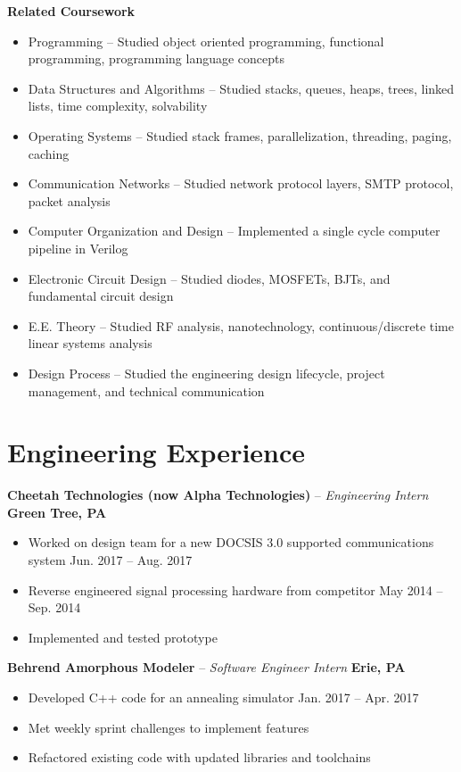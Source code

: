 \documentclass[letterpaper,10pt]{article}
\begin{document}
\textbf{Related Coursework}
{\setlength{\parskip}{0pt}\begin{itemize}
\item Programming -- Studied object oriented programming, functional programming, programming language concepts
\item Data Structures and Algorithms -- Studied stacks, queues, heaps, trees, linked lists, time complexity, solvability
\item Operating Systems -- Studied stack frames, parallelization, threading, paging, caching
\item Communication Networks -- Studied network protocol layers, SMTP protocol, packet analysis
\item Computer Organization and Design -- Implemented a single cycle computer pipeline in Verilog
\item Electronic Circuit Design -- Studied diodes, MOSFETs, BJTs, and fundamental circuit design
\item E.E. Theory -- Studied RF analysis, nanotechnology, continuous/discrete time linear systems analysis
\item Design Process -- Studied the engineering design lifecycle, project management, and technical communication
\end{itemize}}

\section{Engineering Experience}
\textbf{Cheetah Technologies (now Alpha Technologies)} -- \textit{Engineering Intern} \hfill \textbf{Green Tree, PA}
{\setlength{\parskip}{0pt}\begin{itemize}
\item Worked on design team for a new DOCSIS 3.0 supported communications system \hfill Jun. 2017 -- Aug. 2017
\item Reverse engineered signal processing hardware from competitor \hfill May 2014 -- Sep. 2014
\item Implemented and tested prototype
\end{itemize}}
\textbf{Behrend Amorphous Modeler} -- \textit{Software Engineer Intern} \hfill \textbf{Erie, PA}
{\setlength{\parskip}{0pt}\begin{itemize}
\item Developed C++ code for an annealing simulator \hfill Jan. 2017 -- Apr. 2017
\item Met weekly sprint challenges to implement features
\item Refactored existing code with updated libraries and toolchains
\end{itemize}}
\end{document}
